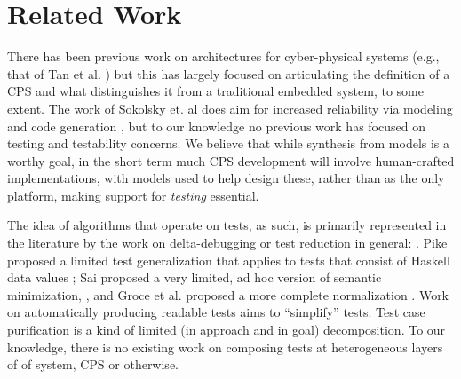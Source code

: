 \section{Related Work}

There has been previous work on architectures for cyber-physical systems (e.g., that of Tan et al. \cite{tan2008prototype}) but this has largely focused on articulating the definition of a CPS and what distinguishes it from a traditional embedded system, to some extent.  The work of Sokolsky et. al does aim for increased reliability via modeling and code generation \cite{sokolsky2014architecture}, but to our knowledge no previous work has focused on testing and testability concerns.  We believe that while synthesis from models is a worthy goal, in the short term much CPS development will involve human-crafted implementations, with models used to help design these, rather than as the only platform, making support for \emph{testing} essential.

The idea of algorithms that operate on tests, as such, is
primarily represented in the literature by the work on
delta-debugging or test reduction in general:
\cite{DD,HDD,TCminim,MinUnit,CReduce,Lithium,DDISSTA,IsolThread,Yesterday}.  Pike proposed a limited test
generalization that applies to tests that consist of Haskell data
values \cite{SmartCheck}; Sai proposed a very limited, ad hoc
version of semantic minimization,
 \cite{SaiSimple}, and Groce et al. proposed a more complete normalization \cite{OneTest}.  Work on automatically producing readable tests \cite{Readable} aims to ``simplify'' tests.  Test case
purification \cite{PureTest} is a kind of limited (in approach and in
goal) decomposition.  To our knowledge, there is no existing work on composing tests at heterogeneous layers of of system, CPS or otherwise.